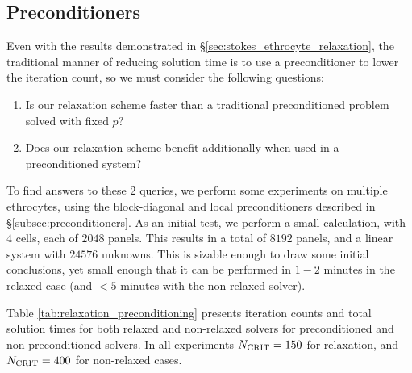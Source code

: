 

\subsection{Preconditioners}\label{sec:rbc_preconditioners}

Even with the results demonstrated in \S\ref{sec:stokes_ethrocyte_relaxation}, the traditional manner of reducing solution time is to use a preconditioner to lower the iteration count, so we must consider the following questions:

\begin{enumerate}
\item Is our relaxation scheme faster than a traditional preconditioned problem solved with fixed $p$?
\item Does our relaxation scheme benefit additionally when used in a preconditioned system?
\end{enumerate}

To find answers to these 2 queries, we perform some experiments on multiple ethrocytes, using the block-diagonal and local preconditioners described in \S\ref{subsec:preconditioners}. As an initial test, we perform a small calculation, with $4$ cells, each of $2048$ panels. This results in a total of $8192$ panels, and a linear system with $24576$ unknowns. This is sizable enough to draw some initial conclusions, yet small enough that it can be performed in $1-2$ minutes in the relaxed case (and $< 5$ minutes with the non-relaxed solver).

Table \ref{tab:relaxation_preconditioning} presents iteration counts and total solution times for both relaxed and non-relaxed solvers for preconditioned and non-preconditioned solvers. In all experiments $N_{\text{CRIT}} = 150$ for relaxation, and $N_{\text{CRIT}} = 400$ for non-relaxed cases.

